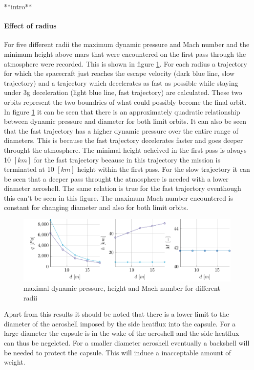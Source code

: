 **intro**

\paragraph{Effect of radius}

For five different radii the maximum dynamic pressure and Mach number and the minimum height above mars that were encountered on the first pass through the atmosphere were recorded. This is shown in figure \ref{fig:radius}. For each radius a trajectory for which the spacecraft just reaches the escape velocity (dark blue line, slow trajectory) and a trajectory which decelerates as fast as possible while staying under 3g deceleration (light blue line, fast trajectory) are calculated. These two orbits represent the two boundries of what could possibly become the final orbit. In figure \ref{fig:radius} it can be seen that there is an approximately quadratic relationship between dynamic pressure and diameter for both limit orbits. It can also be seen that the fast trajectory has a higher dynamic pressure over the entire range of diameters. This is because the fast trajectory decelerates faster and goes deeper throught the atmosphere. The minimal height acheived in the first pass is always 10 $\left[km\right]$ for the fast trajectory because in this trajectory the mission is terminated at 10 $\left[km\right]$ height within the first pass. For the slow trajectory it can be seen that a deeper pass throught the atmosphere is needed with a lower diameter aeroshell. The same relation is true for the fast trajectory eventhough this can't be seen in this figure. The maximum Mach number encountered is constant for changing diameter and also for both limit orbits.

\begin{figure}[H]
	\centering
	\includegraphics[width=\textwidth]{./Figure/orbit/radius_param.pdf}
	\caption{maximal dynamic pressure, height and Mach number for different radii}
	\label{fig:radius}
\end{figure}


Apart from this results it should be noted that there is a lower limit to the diameter of the aeroshell imposed by the side heatflux into the capsule. For a large diameter the capsule is in the wake of the aeroshell and the side heatflux can thus be negelcted. For a smaller diameter aeroshell eventually a backshell will be needed to protect the capsule. This will induce a inacceptable amount of weight.

